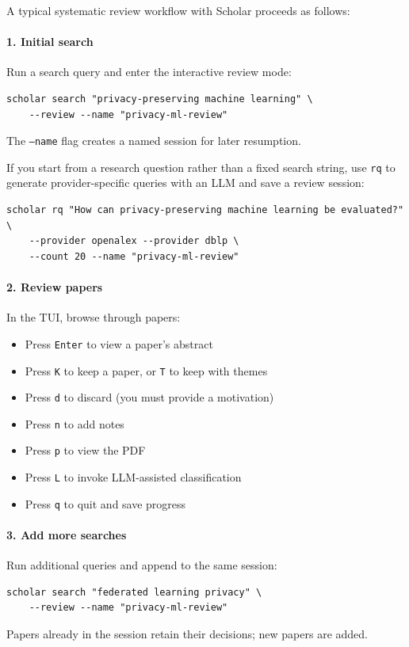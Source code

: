 A typical systematic review workflow with Scholar proceeds as follows:

\paragraph{1. Initial search}
Run a search query and enter the interactive review mode:
\begin{verbatim}
scholar search "privacy-preserving machine learning" \
    --review --name "privacy-ml-review"
\end{verbatim}
The \texttt{--name} flag creates a named session for later resumption.

If you start from a research question rather than a fixed search string, use
\texttt{rq} to generate provider-specific queries with an LLM and save a review
session:
\begin{verbatim}
scholar rq "How can privacy-preserving machine learning be evaluated?" \
    --provider openalex --provider dblp \
    --count 20 --name "privacy-ml-review"
\end{verbatim}

\paragraph{2. Review papers}
In the TUI, browse through papers:
\begin{itemize}
\item Press \texttt{Enter} to view a paper's abstract
\item Press \texttt{K} to keep a paper, or \texttt{T} to keep with themes
\item Press \texttt{d} to discard (you must provide a motivation)
\item Press \texttt{n} to add notes
\item Press \texttt{p} to view the PDF
\item Press \texttt{L} to invoke LLM-assisted classification
\item Press \texttt{q} to quit and save progress
\end{itemize}

\paragraph{3. Add more searches}
Run additional queries and append to the same session:
\begin{verbatim}
scholar search "federated learning privacy" \
    --review --name "privacy-ml-review"
\end{verbatim}
Papers already in the session retain their decisions; new papers are added.

